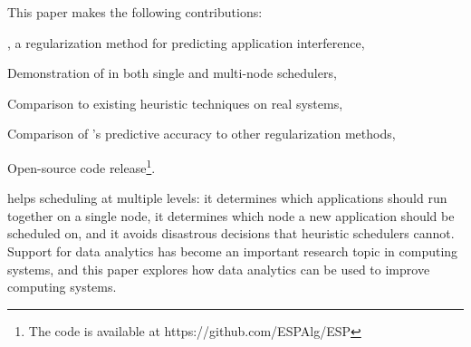 This paper makes the following contributions:
\begin{inparaenum}[1)]
\item \SYSTEMESP{}, a regularization method for predicting application
  interference,
\item Demonstration of \SYSTEMESP{} in both single and multi-node
  schedulers,
\item Comparison to existing heuristic techniques on real systems,
\item Comparison of \SYSTEMESP{}'s predictive accuracy to other
  regularization methods,
\item Open-source code release\footnote{The code is available at
    https://github.com/ESPAlg/ESP}.
\end{inparaenum}
\SYSTEMESP{} helps scheduling at multiple levels: it determines which
applications should run together on a single node, it determines which
node a new application should be scheduled on, and it avoids
disastrous decisions that heuristic schedulers cannot.  Support for
data analytics has become an important research topic in computing
systems, and this paper explores how data analytics can be used to
improve computing systems.
